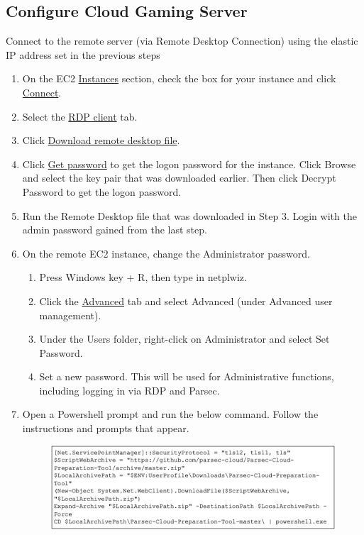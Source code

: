 \documentclass[titlepage, 12pt]{article}
\begin{document}
	\subsection*{Configure Cloud Gaming Server}

	Connect to the remote server (via Remote Desktop Connection) using the elastic IP address set in the previous steps

	\begin{enumerate}
	\item{On the EC2 \underline{Instances} section, check the box for your instance and click \underline{Connect}.}
	\item{Select the \underline{RDP client} tab.}
	\item{Click \underline{Download remote desktop file}.}
	\item{Click \underline{Get password} to get the logon password for the instance. Click Browse and select the key pair that was downloaded earlier. Then click Decrypt Password to get the logon password.}
	\item{Run the Remote Desktop file that was downloaded in Step 3. Login with the admin password gained from the last step.}
	\item{On the remote EC2 instance, change the Administrator password. }
		\begin{enumerate}
		\item{Press Windows key + R, then type in netplwiz.}
		\item{Click the \underline{Advanced} tab and select Advanced (under Advanced user management).}
		\item{Under the Users folder, right-click on Administrator and select Set Password.}
		\item{Set a new password. This will be used for Administrative functions, including logging in via RDP and Parsec.}
		\end{enumerate}
	\item{Open a Powershell prompt and run the below command. Follow the instructions and prompts that appear.}
		\begin{figure}[ht]
		\centering
		\includegraphics{powershell.png}

\end{figure}
\end{enumerate}
\end{document}

